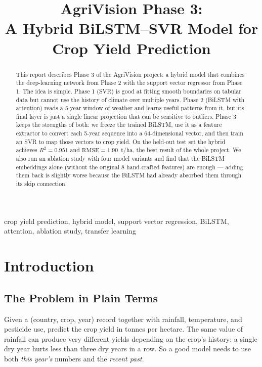 \documentclass[conference]{IEEEtran}
\begin{document}
\title{AgriVision Phase 3:\\
A Hybrid BiLSTM--SVR Model for Crop Yield Prediction}

\author{
}

\maketitle

\begin{abstract}
This report describes Phase 3 of the AgriVision project: a hybrid model that combines the deep-learning network from Phase 2 with the support vector regressor from Phase 1. The idea is simple. Phase 1 (SVR) is good at fitting smooth boundaries on tabular data but cannot use the history of climate over multiple years. Phase 2 (BiLSTM with attention) reads a 5-year window of weather and learns useful patterns from it, but its final layer is just a single linear projection that can be sensitive to outliers. Phase 3 keeps the strengths of both: we freeze the trained BiLSTM, use it as a feature extractor to convert each 5-year sequence into a 64-dimensional vector, and then train an SVR to map those vectors to crop yield. On the held-out test set the hybrid achieves $R^{2}=0.951$ and $\text{RMSE}=1.90$~t/ha, the best result of the whole project. We also run an ablation study with four model variants and find that the BiLSTM embeddings alone (without the original 8 hand-crafted features) are enough — adding them back is slightly worse because the BiLSTM had already absorbed them through its skip connection.
\end{abstract}

\begin{IEEEkeywords}
crop yield prediction, hybrid model, support vector regression, BiLSTM, attention, ablation study, transfer learning
\end{IEEEkeywords}

\section{Introduction}
\label{sec:intro}

\subsection{The Problem in Plain Terms}
Given a (country, crop, year) record together with rainfall, temperature, and pesticide use, predict the crop yield in tonnes per hectare. The same value of rainfall can produce very different yields depending on the crop's history: a single dry year hurts less than three dry years in a row. So a good model needs to use both \emph{this year's} numbers and the \emph{recent past}.
\end{document}
